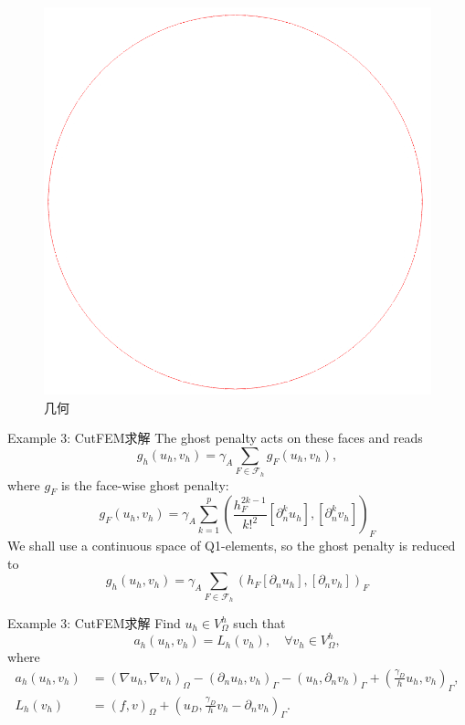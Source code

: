\documentclass[lang=en,aspectratio=43,theme=default,logo=on]{simplebeamer}
\begin{document}
\begin{frame}[fragile]
\begin{figure}
\begin{minipage}[t]{0.5\linewidth}
        \includegraphics[height=0.5\textheight]{./img/010.png}
        \caption{几何}
    \end{minipage}
\end{figure}
\end{frame}

\begin{frame}{Example 3: CutFEM求解}
The ghost penalty acts on these faces and reads
\begin{equation*}
    g_h(u_h,v_h) = \gamma_A \sum_{F \in \mathcal{F}_h} g_F(u_h, v_h),
\end{equation*}
where $g_F$ is the face-wise ghost penalty:
\begin{equation*}
    g_F(u_h, v_h) = \gamma_A \sum_{k=1}^p \left(\frac{h_F^{2k-1}}{k!^2}[\partial_n^k u_h], [\partial_n^k v_h] \right)_F
\end{equation*}
We shall use a continuous space of Q1-elements, so the ghost penalty is reduced to
\begin{equation*}
    g_h(u_h,v_h) = \gamma_A \sum_{F \in \mathcal{F}_h} (h_F [\partial_n u_h], [\partial_n v_h])_F
\end{equation*}
\end{frame}

\begin{frame}[fragile]{Example 3: CutFEM求解}
Find $u_h \in V_\Omega^h$ such that
\begin{equation*}
    a_h(u_h, v_h) = L_h(v_h), \quad \forall v_h \in V_\Omega^h,
\end{equation*}
where
\begin{align*}
    a_h(u_h, v_h) &=  (\nabla u_h, \nabla v_h)_\Omega
    - (\partial_n u_h, v_h)_\Gamma
    - (u_h, \partial_n v_h)_\Gamma
    + \left (\frac{\gamma_D}{h} u_h, v_h \right )_\Gamma,
    \\
    L_h(v_h)      &=  (f,v)_\Omega
    + \left (u_D, \frac{\gamma_D}{h} v_h -\partial_n v_h \right )_\Gamma.
\end{align*}
\end{frame}
\end{document}
